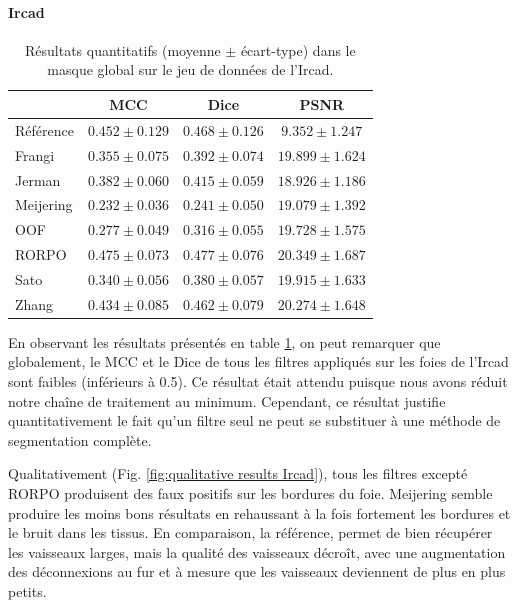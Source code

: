 \paragraph{Ircad}

\begin{table}[!ht]
  \begin{center}
      \caption{Résultats quantitatifs (moyenne $\pm$ écart-type) dans le masque global \maskglobal sur le jeu de données de l'Ircad.}
      \label{tab:quantitative results Ircad}
      \begin{tabular}{lccc}
          \hline
          & MCC & Dice & PSNR \\ 
          \hline
          Référence	& $ 0.452 \pm 0.129	$ & $ 0.468 \pm	0.126 $ & $	9.352  \pm  1.247 $ \\
          Frangi	    & $ 0.355 \pm 0.075	$ & $ 0.392 \pm	0.074 $ & $	19.899 \pm 	1.624 $ \\
          Jerman	    & $ 0.382 \pm 0.060	$ & $ 0.415 \pm	0.059 $ & $	18.926 \pm 	1.186 $ \\
          Meijering   & $ 0.232 \pm 0.036	$ & $ 0.241 \pm	0.050 $ & $	19.079 \pm 	1.392 $ \\
          OOF	        & $ 0.277 \pm 0.049	$ & $ 0.316 \pm	0.055 $ & $	19.728 \pm 	1.575 $ \\
          RORPO	    & $ 0.475 \pm 0.073	$ & $ 0.477 \pm	0.076 $ & $	20.349 \pm 	1.687 $ \\
          Sato	    & $ 0.340 \pm 0.056	$ & $ 0.380 \pm	0.057 $ & $	19.915 \pm 	1.633 $ \\
          Zhang	    & $ 0.434 \pm 0.085	$ & $ 0.462 \pm	0.079 $ & $	20.274 \pm 	1.648 $ \\
    
          \hline
      \end{tabular}  
      \end{center}    
\end{table}

En observant les résultats présentés en table \ref{tab:quantitative results Ircad}, on peut remarquer que globalement, le MCC et le Dice de tous les filtres appliqués sur les foies de l'Ircad sont faibles (inférieurs à 0.5). Ce résultat était attendu puisque nous avons réduit notre chaîne de traitement au minimum. Cependant, ce résultat justifie quantitativement le fait qu'un filtre seul ne peut se substituer à une méthode de segmentation complète.

Qualitativement (Fig. \ref{fig:qualitative results Ircad}), tous les filtres excepté RORPO produisent des faux positifs sur les bordures du foie. Meijering semble produire les moins bons résultats en rehaussant à la fois fortement les bordures et le bruit dans les tissus. En comparaison, la référence, permet de bien récupérer les vaisseaux larges, mais la qualité des vaisseaux décroît, avec une augmentation des déconnexions au fur et à mesure que les vaisseaux deviennent de plus en plus petits. 

